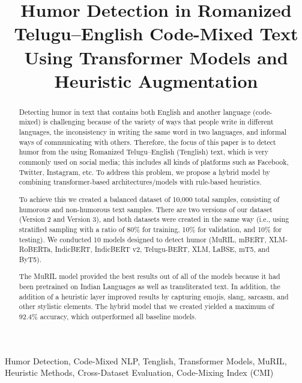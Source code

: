 \documentclass[conference]{IEEEtran}
\begin{document}
\title{Humor Detection in Romanized Telugu–English Code-Mixed Text Using Transformer Models and Heuristic Augmentation}

\author{
}

\maketitle

\begin{abstract}
Detecting humor in text that contains both English and another language (code-mixed) is challenging because of the variety of ways that people write in different languages, the inconsistency in writing the same word in two languages, and informal ways of communicating with others. Therefore, the focus of this paper is to detect humor from the using Romanized Telugu–English (Tenglish) text, which is very commonly used on social media; this includes all kinds of platforms such as Facebook, Twitter, Instagram, etc. To address this problem, we propose a hybrid model by combining transformer-based architectures/models with rule-based heuristics.

To achieve this we created a balanced dataset of 10,000 total samples, consisting of humorous and non-humorous text samples. There are two versions of our dataset (Version 2 and Version 3), and both datasets were created in the same way (i.e., using stratified sampling with a ratio of 80\% for training, 10\% for validation, and 10\% for testing). We conducted 10 models designed to detect humor (MuRIL, mBERT, XLM-RoBERTa, IndicBERT, IndicBERT v2, Telugu-BERT, XLM, LaBSE, mT5, and ByT5).

The MuRIL model provided the best results out of all of the models because it had been pretrained on Indian Languages as well as transliterated text. In addition, the addition of a heuristic layer improved results by capturing emojis, slang, sarcasm, and other stylistic elements. The hybrid model that we created yielded a maximum of 92.4\% accuracy, which outperformed all baseline models.

\end{abstract}

\begin{IEEEkeywords}
Humor Detection, Code-Mixed NLP, Tenglish, Transformer Models, MuRIL, Heuristic Methods, Cross-Dataset Evaluation, Code-Mixing Index (CMI)
\end{IEEEkeywords}
\end{document}
